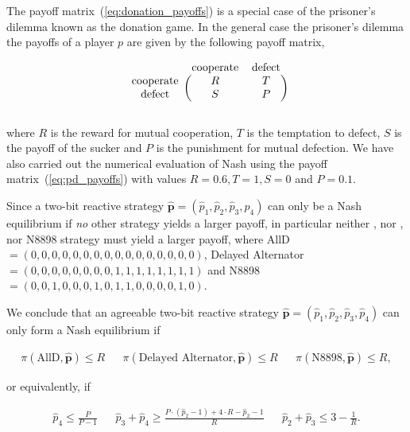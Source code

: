 \documentclass{article}
\theoremstyle{definition}
\begin{document}
The payoff matrix~(\ref{eq:donation_payoffs}) is a special case of the
prisoner's dilemma known as the donation game. In the general case the
prisoner's dilemma the payoffs of a player \(p\) are given by the following
payoff matrix,

\begin{equation}\label{eq:pd_payoffs}
  \begin{blockarray}{ccc}
      & \text{cooperate} & \text{defect} \\
      \begin{block}{c(cc)}
          \text{cooperate} & R & T \\
          \text{defect} & S & P \\
      \end{block}
  \end{blockarray}
\end{equation}

where \(R\) is the reward for mutual cooperation, \(T\) is the temptation to
defect, \(S\) is the payoff of the sucker and \(P\) is the punishment for mutual
defection. We have also carried out the numerical evaluation of Nash using the
payoff matrix~(\ref{eq:pd_payoffs}) with values \(R=0.6, T=1, S=0\) and
\(P=0.1\).

Since a two-bit reactive strategy \(\mathbf{\hat{p}} = (\hat{p}_{1},
\hat{p}_{2}, \hat{p}_{3}, \hat{p}_{4})\) can only be a Nash equilibrium if {\it
no} other strategy yields a larger payoff, in particular neither ,
nor , nor N8898 strategy must yield a larger payoff, where AllD\(=(0,
0, 0, 0, 0, 0, 0, 0, 0, 0, 0, 0, 0, 0, 0, 0)\), Delayed Alternator\(=(0, 0, 0,
0, 0, 0, 0, 0, 1, 1, 1, 1, 1, 1, 1, 1)\) and N8898\(=(0, 0, 1, 0, 0, 0, 1, 0, 1,
1, 0, 0, 0, 0, 1, 0)\).

We conclude that an agreeable two-bit reactive strategy  \(\mathbf{\hat{p}} =
(\hat{p}_{1}, \hat{p}_{2}, \hat{p}_{3}, \hat{p}_{4})\) can only form a Nash
equilibrium if

\begin{align*}
\pi(\text{AllD}, \mathbf{\hat{p}}) \leq R & & \pi(\text{Delayed Alternator}, \mathbf{\hat{p}}) \leq R & & \pi(\text{N8898}, \mathbf{\hat{p}}) \leq R,
\end{align*}

or equivalently, if

\begin{align}\label{Eq:NashConditionDonationGamePD}
  \hat{p}_4 \leq \frac{P}{P - 1} & & \hat{p}_3 + \hat{p}_4 \geq \frac{P \cdot (\hat{p}_2 - 1) + 4 \cdot R - \hat{p}_2 - 1}{R} &  &  \hat{p}_2 + \hat{p}_3 \leq 3 - \frac{1}{R}.
\end{align}
\end{document}
